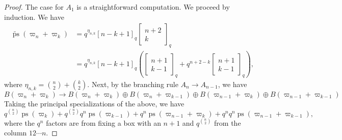 \documentclass[11pt, leqno]{amsart}
\theoremstyle{plain}
\theoremstyle{definition}
\numberwithin{equation}{section}
\newcommand{\qbinom}[3]{\left[ \begin{matrix} #1 \\ #2 \end{matrix} \right]_{#3}} %
\newcommand{\ps}{\operatorname{ps}} %
\newcommand{\nps}{\widetilde{\ps}} %
\begin{document}
\begin{proof}
The case for $A_1$ is a straightforward computation. We proceed by induction.
We have
\begin{equation}
\label{eq:branching_target}
\begin{split}
\nps(\varpi_n + \varpi_k) & = q^{\eta_{n,k}} [n-k+1]_q \qbinom{n+2}{k}{q}
\\ & = q^{\eta_{n,k}} [n-k+1]_q \left( \qbinom{n+1}{k-1}{q} + q^{n+2-k} \qbinom{n+1}{k-1}{q} \right),
\end{split}
\end{equation}
where $\eta_{n,k} = \binom{n}{2} + \binom{k}{2}$.
Next, by the branching rule $A_n \to A_{n-1}$, we have
\[
B(\varpi_n + \varpi_k) \to B(\varpi_n + \varpi_k) \oplus B(\varpi_n + \varpi_{k-1}) \oplus B(\varpi_{n-1} + \varpi_k) \oplus B(\varpi_{n-1} + \varpi_{k-1})
\]
Taking the principal specializations of the above, we have
\begin{equation}
\label{eq:ch_spec_branching}
q^{\binom{n}{2}} \ps(\varpi_k) + q^{\binom{n}{2}} q^n \ps(\varpi_{k-1}) + q^n \ps(\varpi_{n-1} + \varpi_k) + q^n q^n \ps(\varpi_{n-1} + \varpi_{k-1}),
\end{equation}
where the $q^n$ factors are from fixing a box with an $n+1$ and $q^{\binom{n}{2}}$ from the column $1 2 \cdots n$.


\end{proof}
\end{document}
